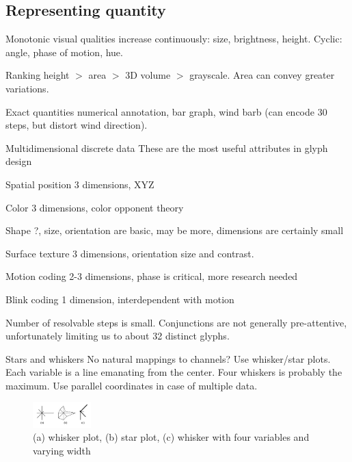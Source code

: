 \begin{mdframed}\begin{multicols}{2}
\subsection{Representing quantity}
\begin{compactdesc}
    \item[Monotonic visual qualities] increase continuously: size,
        brightness, height. Cyclic: angle, phase of motion, hue.
    \item[Ranking] height $>$ area $>$ 3D volume $>$ grayscale.
        Area can convey greater variations.
    \item[Exact quantities] numerical annotation, bar graph, wind barb (can
        encode 30 steps, but distort wind direction).
    \item[Multidimensional discrete data]
        These are the most useful attributes in glyph design
    \begin{compactdesc}
        \item[Spatial position] 3 dimensions, XYZ
        \item[Color] 3 dimensions, color opponent theory
        \item[Shape] ?, size, orientation are basic, may be more, dimensions are
            certainly small
        \item[Surface texture] 3 dimensions, orientation size and contrast.
        \item[Motion coding] 2-3 dimensions, phase is critical, more research
            needed
        \item[Blink coding] 1 dimension, interdependent with motion
    \end{compactdesc}
        Number of resolvable steps is small. Conjunctions are not generally
        pre-attentive, unfortunately limiting us to about 32 distinct glyphs.
    \item[Stars and whiskers]
        No natural mappings to channels? Use whisker/star plots. Each variable
        is a line emanating from the center. Four whiskers is probably the
        maximum. Use parallel coordinates in case of multiple data.
    \begin{figure}[H]
        \centering
        \includegraphics[width=0.2\textwidth]{whisker_star.png}
        \caption{(a) whisker plot, (b) star plot, (c) whisker with four variables and varying width}
    \end{figure}
\end{compactdesc}
\end{multicols}
\end{mdframed}


